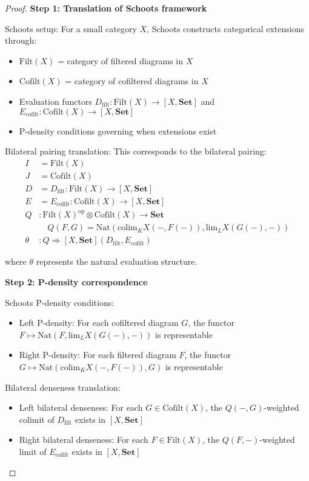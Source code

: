 \documentclass[11pt]{article}
\theoremstyle{plain}
\theoremstyle{definition}
\theoremstyle{remark}
\newcommand{\op}{\mathrm{op}}
\newcommand{\colim}{\mathrm{colim}}
\renewcommand{\lim}{\mathrm{lim}}
\begin{document}
\begin{proof}
\textbf{Step 1: Translation of Schoots framework}

Schoots setup: For a small category $X$, Schoots constructs categorical extensions through:
\begin{itemize}
\item $\text{Filt}(X)$ = category of filtered diagrams in $X$
\item $\text{Cofilt}(X)$ = category of cofiltered diagrams in $X$
\item Evaluation functors $D_{\text{filt}} : \text{Filt}(X) \to [X, \mathbf{Set}]$ and $E_{\text{cofilt}} : \text{Cofilt}(X) \to [X, \mathbf{Set}]$
\item P-density conditions governing when extensions exist
\end{itemize}

Bilateral pairing translation: This corresponds to the bilateral pairing:
\begin{align}
I &= \text{Filt}(X) \\
J &= \text{Cofilt}(X) \\
D &= D_{\text{filt}} : \text{Filt}(X) \to [X, \mathbf{Set}] \\
E &= E_{\text{cofilt}} : \text{Cofilt}(X) \to [X, \mathbf{Set}] \\
Q &: \text{Filt}(X)^{\op} \otimes \text{Cofilt}(X) \to \mathbf{Set} \\
&\quad Q(F, G) = \text{Nat}(\colim_K X(-, F(-)), \lim_L X(G(-), -)) \\
\theta &: Q \Rightarrow [X, \mathbf{Set}](D_{\text{filt}}, E_{\text{cofilt}})
\end{align}

where $\theta$ represents the natural evaluation structure.

\textbf{Step 2: P-density correspondence}

Schoots P-density conditions:
\begin{itemize}
\item Left P-density: For each cofiltered diagram $G$, the functor $F \mapsto \text{Nat}(F, \lim_L X(G(-), -))$ is representable
\item Right P-density: For each filtered diagram $F$, the functor $G \mapsto \text{Nat}(\colim_K X(-, F(-)), G)$ is representable
\end{itemize}

Bilateral denseness translation:
\begin{itemize}
\item Left bilateral denseness: For each $G \in \text{Cofilt}(X)$, the $Q(-, G)$-weighted colimit of $D_{\text{filt}}$ exists in $[X, \mathbf{Set}]$
\item Right bilateral denseness: For each $F \in \text{Filt}(X)$, the $Q(F, -)$-weighted limit of $E_{\text{cofilt}}$ exists in $[X, \mathbf{Set}]$
\end{itemize}


\end{proof}
\end{document}
